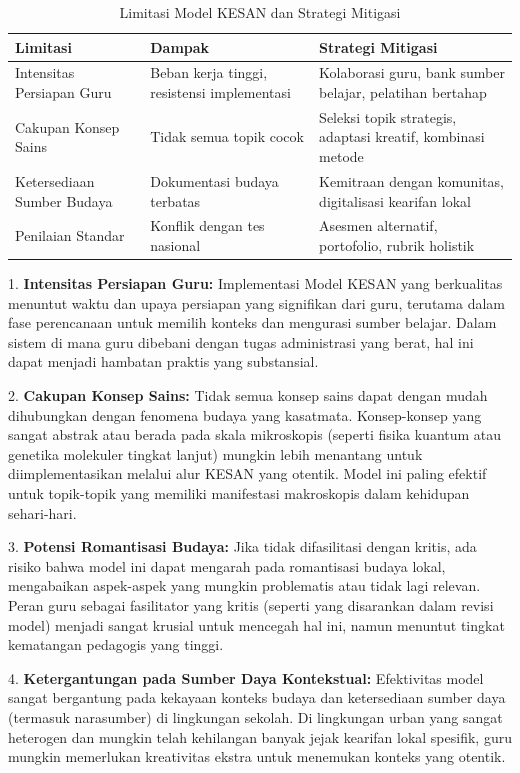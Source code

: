 \documentclass[12pt,a4paper,oneside]{book}
\begin{document}
\begin{table}[H]
\centering
\caption{Limitasi Model KESAN dan Strategi Mitigasi}
\label{tab:limitasi_kesan}
\begin{tabular}{|p{4cm}|p{5cm}|p{5cm}|}
\hline
\textbf{Limitasi} & \textbf{Dampak} & \textbf{Strategi Mitigasi} \\
\hline
Intensitas Persiapan Guru & Beban kerja tinggi, resistensi implementasi & Kolaborasi guru, bank sumber belajar, pelatihan bertahap \\
\hline
Cakupan Konsep Sains & Tidak semua topik cocok & Seleksi topik strategis, adaptasi kreatif, kombinasi metode \\
\hline
Ketersediaan Sumber Budaya & Dokumentasi budaya terbatas & Kemitraan dengan komunitas, digitalisasi kearifan lokal \\
\hline
Penilaian Standar & Konflik dengan tes nasional & Asesmen alternatif, portofolio, rubrik holistik \\
\hline
\end{tabular}
\end{table}

1.  \textbf{Intensitas Persiapan Guru:} Implementasi Model KESAN yang berkualitas menuntut waktu dan upaya persiapan yang signifikan dari guru, terutama dalam fase perencanaan untuk memilih konteks dan mengurasi sumber belajar. Dalam sistem di mana guru dibebani dengan tugas administrasi yang berat, hal ini dapat menjadi hambatan praktis yang substansial.

2.  \textbf{Cakupan Konsep Sains:} Tidak semua konsep sains dapat dengan mudah dihubungkan dengan fenomena budaya yang kasatmata. Konsep-konsep yang sangat abstrak atau berada pada skala mikroskopis (seperti fisika kuantum atau genetika molekuler tingkat lanjut) mungkin lebih menantang untuk diimplementasikan melalui alur KESAN yang otentik. Model ini paling efektif untuk topik-topik yang memiliki manifestasi makroskopis dalam kehidupan sehari-hari.

3.  \textbf{Potensi Romantisasi Budaya:} Jika tidak difasilitasi dengan kritis, ada risiko bahwa model ini dapat mengarah pada romantisasi budaya lokal, mengabaikan aspek-aspek yang mungkin problematis atau tidak lagi relevan. Peran guru sebagai fasilitator yang kritis (seperti yang disarankan dalam revisi model) menjadi sangat krusial untuk mencegah hal ini, namun menuntut tingkat kematangan pedagogis yang tinggi.

4.  \textbf{Ketergantungan pada Sumber Daya Kontekstual:} Efektivitas model sangat bergantung pada kekayaan konteks budaya dan ketersediaan sumber daya (termasuk narasumber) di lingkungan sekolah. Di lingkungan urban yang sangat heterogen dan mungkin telah kehilangan banyak jejak kearifan lokal spesifik, guru mungkin memerlukan kreativitas ekstra untuk menemukan konteks yang otentik.
\end{document}
